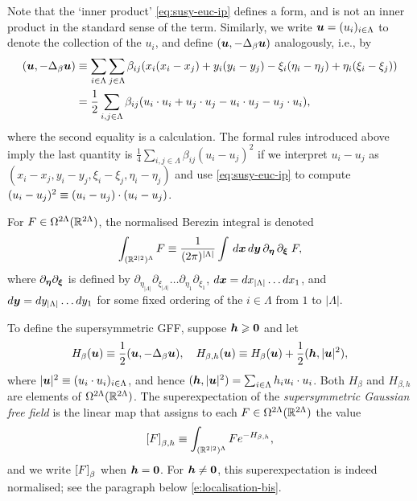 \documentclass[11pt,a4paper]{article}
\begin{document}
Note that the `inner product' %
\eqref{eq:susy-euc-ip} defines a form, and is not an
inner product in the standard sense of the term. Similarly, we
write $\boldsymbol{u} = (u_{i})_{i\in\Lambda}$ to denote the collection of the
$u_{i}$, and define $(\boldsymbol{u},-\Delta_{\beta}\boldsymbol{u})$ analogously, i.e.,
by
\begin{align}
\label{eq:GFF-Action}
(\boldsymbol{u},-\Delta_{\beta}\boldsymbol{u})
&\equiv
\sum_{i\in\Lambda}\sum_{j\in\Lambda} \beta_{ij}(x_{i}(x_{i}-x_{j}) +
y_{i}(y_{i}-y_{j}) -\xi_{i}(\eta_{i}-\eta_{j})
+\eta_{i}(\xi_{i}-\xi_{j}))
\\
&=\frac{1}{2}\sum_{i,j\in\Lambda} \beta_{ij}( u_{i}\cdot u_{i} +
u_{j}\cdot u_{j} - u_{i}\cdot u_{j} - u_j \cdot u_i),
\end{align}
where the second equality is a calculation. The
formal rules introduced above imply the last quantity is
$\frac14\sum_{i,j\in\Lambda}\beta_{ij} (u_{i}-u_{j})^{2}$ if we interpret
$u_{i}-u_{j}$ as
$(x_{i}-x_{j},y_{i}-y_{j},\xi_{i}-\xi_{j},\eta_{i}-\eta_{j})$ and use
\eqref{eq:susy-euc-ip} to compute
$(u_{i}-u_{j})^{2}\equiv   (u_{i}-u_{j})\cdot (u_{i}-u_{j})$.

For $F\in \Omega^{2\Lambda}(\mathbb{R}^{2\Lambda})$, the normalised Berezin integral is denoted
\begin{equation}
  \label{eq:R22int}
  \int_{(\mathbb{R}^{2|2})^{\Lambda}}F \equiv \frac{1}{(2\pi)^{|\Lambda|}}\int\, d\boldsymbol{x}\,d\boldsymbol{y}\, \partial_{\boldsymbol{\eta}}\,\partial_{\boldsymbol{\xi}}\;F,
\end{equation}
where $\partial_{\boldsymbol{\eta}}\partial_{\boldsymbol{\xi}}$ is defined by
$\partial_{\eta_{|\Lambda|}}\partial_{\xi_{|\Lambda|}}\dots \partial_{\eta_{1}}\partial_{\xi_{1}}$,
$d\boldsymbol{x} = dx_{|\Lambda|}\dots dx_{1}$, and
$d\boldsymbol{y}=dy_{|\Lambda|}\dots dy_{1}$ for some fixed ordering of the
$i\in\Lambda$ from $1$ to $|\Lambda|$.

To define the supersymmetric GFF, suppose $\boldsymbol{h}\geqslant \boldsymbol{0}$ and let
\begin{equation}
  \label{eq:SGFF-H}
  H_{\beta}(\boldsymbol{u}) \equiv \frac{1}{2}(\boldsymbol{u},-\Delta_{\beta}\boldsymbol{u}), \quad
  H_{\beta,h}(\boldsymbol{u}) \equiv H_{\beta}(\boldsymbol{u}) + \frac{1}{2}(\boldsymbol{h},|\boldsymbol{u}|^2),
\end{equation}
where $|\boldsymbol{u}|^{2} \equiv ( u_{i}\cdot u_{i})_{i\in\Lambda}$, and
hence $(\boldsymbol{h},|\boldsymbol{u}|^2) = \sum_{i\in\Lambda}h_{i} u_{i}\cdot u_{i}$.
Both $H_{\beta}$ and $H_{\beta,h}$ are elements of
$\Omega^{2\Lambda}(\mathbb{R}^{2\Lambda})$.  The superexpectation of the
\emph{supersymmetric Gaussian free field} is the linear map that
assigns to each $F\in \Omega^{2\Lambda}(\mathbb{R}^{2\Lambda})$ the value
\begin{equation}
  \label{eq:SGFF-E}
  \cb{F}_{\beta,h}
  \bydef \int_{(\R^{2|2})^{\Lambda}}F e^{-H_{\beta,h}},
\end{equation}
and we write $\cb{F}_{\beta}$ when $\boldsymbol{h}=\boldsymbol{0}$.  For $\boldsymbol{h} \neq \boldsymbol{0}$,
this superexpectation is indeed normalised; see the paragraph below
\eqref{e:localisation-bis}.
\end{document}
